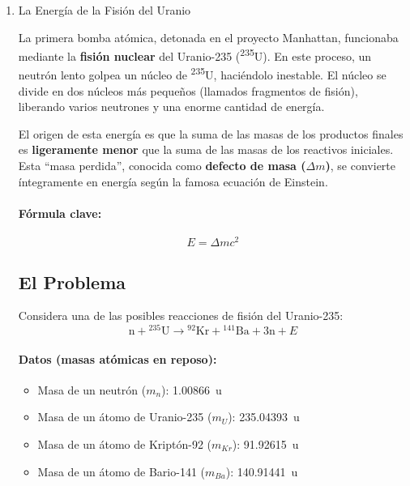 \documentclass[11pt,a4paper]{article}
\begin{document}
\begin{enumerate}
\subsection*{Conclusión}
Aunque teóricamente solo se necesitan unos \SI{206}{\watt} de potencia absorbida para realizar el corte, debido a las ineficiencias del proceso, se requiere un láser mucho más potente. Para un láser industrial realista de \SI{4000}{\watt}, el haz deposita en el punto de contacto la asombrosa cantidad de \num{2.13e23} fotones cada segundo para lograr cortar la placa de acero de \SI{20}{\milli\meter}.

\item La Energía de la Fisión del Uranio

La primera bomba atómica, detonada en el proyecto Manhattan, funcionaba mediante la \textbf{fisión nuclear} del Uranio-235 (\textsuperscript{235}U). En este proceso, un neutrón lento golpea un núcleo de \textsuperscript{235}U, haciéndolo inestable. El núcleo se divide en dos núcleos más pequeños (llamados fragmentos de fisión), liberando varios neutrones y una enorme cantidad de energía.

El origen de esta energía es que la suma de las masas de los productos finales es \textbf{ligeramente menor} que la suma de las masas de los reactivos iniciales. Esta ``masa perdida'', conocida como \textbf{defecto de masa ($\Delta m$)}, se convierte íntegramente en energía según la famosa ecuación de Einstein.

\paragraph{Fórmula clave:}
\[ E = \Delta m c^2 \]

\subsection*{El Problema}
Considera una de las posibles reacciones de fisión del Uranio-235:
\[ \text{n} + {}^{235}\text{U} \rightarrow {}^{92}\text{Kr} + {}^{141}\text{Ba} + 3\text{n} + E \]

\paragraph{Datos (masas atómicas en reposo):}
\begin{itemize}
    \item Masa de un neutrón ($m_n$): \SI{1.00866}{\atomicmassunit}
    \item Masa de un átomo de Uranio-235 ($m_U$): \SI{235.04393}{\atomicmassunit}
    \item Masa de un átomo de Kriptón-92 ($m_{Kr}$): \SI{91.92615}{\atomicmassunit}
    \item Masa de un átomo de Bario-141 ($m_{Ba}$): \SI{140.91441}{\atomicmassunit}
\end{itemize}


\end{enumerate}
\end{document}
